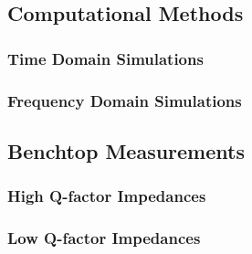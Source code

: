 

\subsection{Computational Methods}

\subsubsection{Time Domain Simulations}

\subsubsection{Frequency Domain Simulations}

\subsection{Benchtop Measurements}

\subsubsection{High Q-factor Impedances}

\subsubsection{Low Q-factor Impedances}